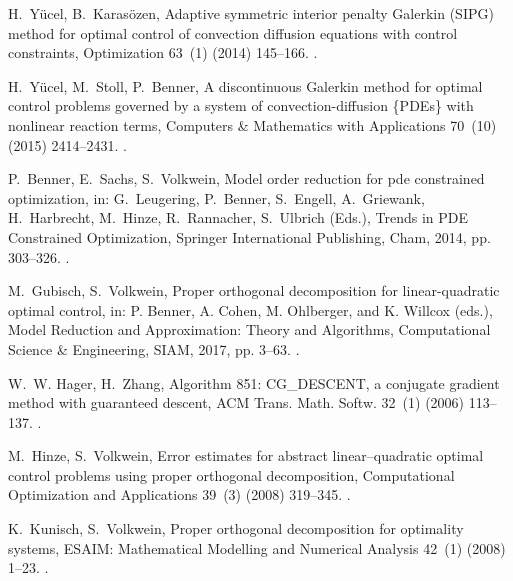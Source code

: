 \documentclass[preprint,12pt]{elsarticle}
\begin{document}
\begin{thebibliography}{10}
H.~Y\"ucel, B.~Karas{\"o}zen, Adaptive symmetric interior penalty {Galerkin}
  {(SIPG)} method for optimal control of convection diffusion equations with
  control constraints, Optimization 63~(1) (2014) 145--166.
\newblock \href {https://doi.org/10.1080/02331934.2013.801474}
  {}.

H.~Y\"ucel, M.~Stoll, P.~Benner, A discontinuous {Galerkin} method for optimal
  control problems governed by a system of convection-diffusion \{PDEs\} with
  nonlinear reaction terms, Computers \& Mathematics with Applications 70~(10)
  (2015) 2414--2431.
\newblock \href {https://doi.org/10.1016/j.camwa.2015.09.006}
  {}.

P.~Benner, E.~Sachs, S.~Volkwein, Model order reduction for pde constrained
  optimization, in: G.~Leugering, P.~Benner, S.~Engell, A.~Griewank,
  H.~Harbrecht, M.~Hinze, R.~Rannacher, S.~Ulbrich (Eds.), Trends in PDE
  Constrained Optimization, Springer International Publishing, Cham, 2014, pp.
  303--326.
\newblock \href {https://doi.org/10.1007/978-3-319-05083-6\_19}
  {}.

M.~Gubisch, S.~Volkwein, Proper orthogonal decomposition for linear-quadratic
  optimal control, in: P. Benner, A. Cohen, M. Ohlberger,
  and K. Willcox (eds.), Model Reduction and Approximation: Theory and
  Algorithms, Computational Science \& Engineering, SIAM, 2017, pp. 3--63.
	\newblock \href {https://doi.org/10.1137/1.9781611974829.ch1}
  {}.

W.~W. Hager, H.~Zhang, Algorithm 851: {CG\_DESCENT}, a conjugate gradient
  method with guaranteed descent, ACM Trans. Math. Softw. 32~(1) (2006)
  113--137.
\newblock \href {https://doi.org/10.1145/1132973.1132979}
  {}.

M.~Hinze, S.~Volkwein, Error estimates for abstract linear--quadratic optimal
  control problems using proper orthogonal decomposition, Computational
  Optimization and Applications 39~(3) (2008) 319--345.
\newblock \href {https://doi.org/10.1007/s10589-007-9058-4}
  {}.

K.~Kunisch, S.~Volkwein, Proper orthogonal decomposition for optimality
  systems, ESAIM: Mathematical Modelling and Numerical Analysis 42~(1) (2008)
  1--23.
\newblock \href {https://doi.org/10.1051/m2an:2007054}
  {}.


\end{thebibliography}
\end{document}
